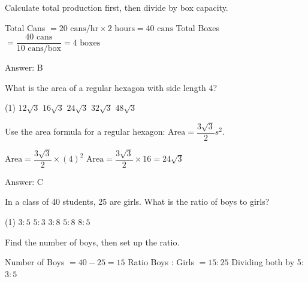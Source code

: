 \documentclass[11pt,paper=a4,answers]{exam}
\begin{document}
\begin{questions}
\begin{solution}
Calculate total production first, then divide by box capacity.
\vspace{5pt}
\begin{center}
Total Cans $= 20 \text{ cans/hr} \times 2 \text{ hours} = 40 \text{ cans}$
\vspace{5pt}
Total Boxes $= \dfrac{40 \text{ cans}}{10 \text{ cans/box}} = 4 \text{ boxes}$
\end{center}

Answer: \colorbox{yellow!100}{B}
\end{solution}

\vspace{1cm}

\question
What is the area of a regular hexagon with side length 4?

\begin{tasks}(1)
\task[A)] $12\sqrt{3}$ \task[B)] $16\sqrt{3}$ \task[C)] $24\sqrt{3}$ \task[D)] $32\sqrt{3}$ \task[E)] $48\sqrt{3}$
\end{tasks}

\begin{solution}
Use the area formula for a regular hexagon: $\text{Area} = \dfrac{3\sqrt{3}}{2}s^2$.
\vspace{5pt}
\begin{center}
$\text{Area} = \dfrac{3\sqrt{3}}{2} \times (4)^2$
\vspace{5pt}
$\text{Area} = \dfrac{3\sqrt{3}}{2} \times 16 = 24\sqrt{3}$
\end{center}

Answer: \colorbox{yellow!100}{C}
\end{solution}

\vspace{1cm}

\question
In a class of 40 students, 25 are girls. What is the ratio of boys to girls?

\begin{tasks}(1)
\task[A)] $3 : 5$ \task[B)] $5 : 3$ \task[C)] $3 : 8$ \task[D)] $5 : 8$ \task[E)] $8 : 5$
\end{tasks}

\begin{solution}
Find the number of boys, then set up the ratio.
\vspace{5pt}
\begin{center}
Number of Boys $= 40 - 25 = 15$
\vspace{5pt}
Ratio Boys : Girls $= 15 : 25$
\vspace{5pt}
Dividing both by 5: $3 : 5$
\end{center}


\end{solution}
\end{questions}
\end{document}
